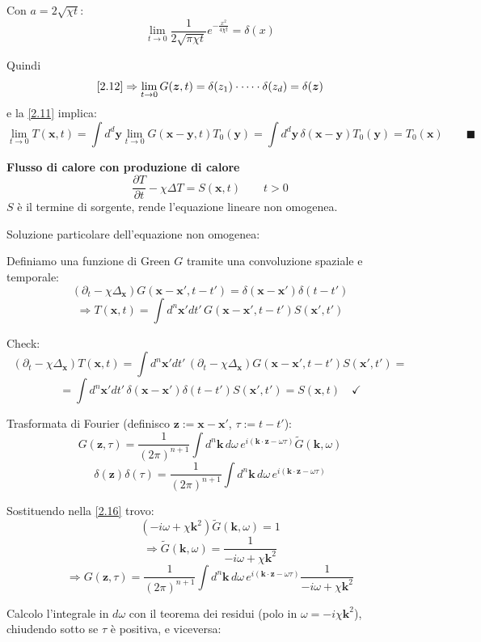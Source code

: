 \documentclass[a4paper,11pt]{report}
\newcommand{\x}{\boldsymbol{x}}
\newcommand{\y}{\boldsymbol{y}}
\newcommand{\kk}{\boldsymbol{k}}
\newcommand{\z}{\boldsymbol{z}}
\begin{document}
Con $a=2\sqrt{\chi t}:$
\begin{equation}
\lim_{t \to 0}\frac{1}{2\sqrt{\pi\chi t}}e^{-\frac{x^2}{4\chi t}}=\delta(x)
\end{equation}

Quindi
\[
\eqref{2.12}\Rightarrow\lim_{t\to 0} G(\z,t)=\delta(z_1)\cdot\dots\cdot\delta(z_d)=\delta(\z)
\]
e la \eqref{2.11} implica:
\[
\lim_{t\to 0}T(\x,t)=\int d^d\y \lim_{t\to 0}G(\x-\y,t)T_0(\y)=\int d^d \y\,\delta(\x-\y)T_0(\y)=T_0(\x) \qquad \blacksquare
\]

\medskip

\textbf{Flusso di calore con produzione di calore}
\[
\frac{\partial T}{\partial t} -\chi\Delta T=S(\x,t) \qquad t>0
\]
$S$ \`e il termine di sorgente, rende l'equazione lineare non omogenea.

\smallskip

Soluzione particolare dell'equazione non omogenea:

Definiamo una funzione di Green $G$ tramite una convoluzione spaziale e temporale:
\begin{equation}
\left(\partial_t-\chi\Delta_{\x}\right)G(\x-\x', t-t')=\delta(\x-\x')\delta(t-t')
\label{2.16}
\end{equation}
\begin{equation}
\Rightarrow T(\x,t)=\int d^n\x'dt'\,G(\x-\x', t-t')S(\x', t')
\label{2.17}
\end{equation}

Check: 
\[
(\partial_t-\chi\Delta_{\x})T(\x,t)=\int d^n\x'dt'\,(\partial_t-\chi\Delta_{\x})G(\x-\x',t-t')S(\x',t')=
\]
\[
=\int d^n\x'dt' \,\delta(\x-\x')\delta(t-t') S(\x',t')=S(\x,t) \quad \checkmark
\]

Trasformata di Fourier (definisco $\z:=\x-\x'$, $\tau := t-t'$):
\[
G(\z,\tau)=\frac{1}{(2\pi)^{n+1}}\int d^n\kk\, d\omega \, e^{i(\kk\cdot \z-\omega\tau)}\tilde{G}(\kk ,\omega)
\]
\[
\delta(\z)\delta(\tau)=\frac{1}{(2\pi)^{n+1}}\int d^n\kk\, d\omega \, e^{i(\kk\cdot \z-\omega\tau)}
\]

Sostituendo nella \eqref{2.16} trovo:
\[
(-i\omega+\chi\kk ^2)\tilde{G}(\kk ,\omega)=1
\]
\[
\Rightarrow\tilde{G}(\kk ,\omega)=\frac{1}{-i\omega+\chi\kk ^2}
\]
\[
\Rightarrow G(\z,\tau)=\frac{1}{(2\pi)^{n+1}}\int d^n\kk\, d\omega \, e^{i(\kk\cdot \z-\omega\tau)}\frac{1}{-i\omega+\chi\kk ^2}
\]

Calcolo l'integrale in $d\omega$ con il teorema dei residui (polo in $\omega=-i\chi \kk^2$), chiudendo sotto se $\tau$ \`e positiva, e viceversa:
\end{document}
